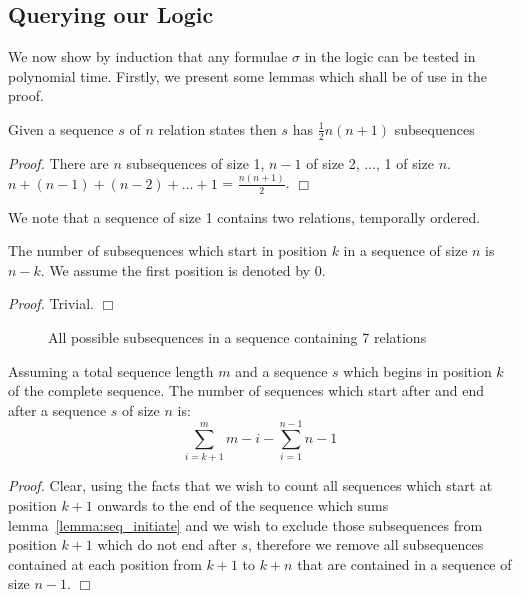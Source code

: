 \subsection{Querying our Logic}\label{subsec:logic_query}

We now show by induction that any formulae $\sigma$ in the logic can be tested
in polynomial time. Firstly, we present some lemmas which shall be of use
in the proof.


\begin{lemma}\label{lemma:subseq}
\begin{rm}
Given a sequence $s$ of $n$ relation states then $s$ has $\frac{1}{2}
n(n+1)$ subsequences
\end{rm}
\end{lemma}

{\em Proof.} There are $n$ subsequences of size 1, $n-1$ of size 2,
$\ldots$, 1 of size $n$. $n + (n-1) + (n-2) + \ldots + 1$ = $\frac{n(n+1)}{2}$. $\Box$

We note that a sequence of size 1 contains two relations, temporally
ordered. 
\begin{lemma}\label{lemma:seq_initiate}
\begin{rm}
The number of subsequences which start in position $k$ in
a sequence of size $n$ is $n-k$. We assume the first position is
denoted by 0.
\end{rm}
\end{lemma}

{\em Proof.} Trivial. $\Box$


\begin{figure}[ht]
\centerline{}
\caption{\label{fig:sequence} All possible subsequences in a sequence
containing 7 relations}
\end{figure}


\begin{lemma}\label{lemma:seq_extend}
\begin{rm}
Assuming a total sequence length $m$ and a sequence $s$ which begins
in position $k$ of the complete sequence. The number of sequences
which start after and end after a sequence $s$ of size $n$ is:  
\[
\sum_{i = k+1}^{m} m - i - \sum_{i = 1}^{n-1} n - 1
\]
\end{rm}
\end{lemma}

{\em Proof.} Clear, using the facts that we wish to count all
sequences which start at position \linebreak $k+1$ onwards to the end of the
sequence which sums lemma~\ref{lemma:seq_initiate} and we wish to
exclude those subsequences from position $k + 1$ which do not end
after $s$, therefore we remove all subsequences contained at each
position from $k+1$ to $k+n$ that are contained in a sequence of size
$n-1$. $\Box$  
 
